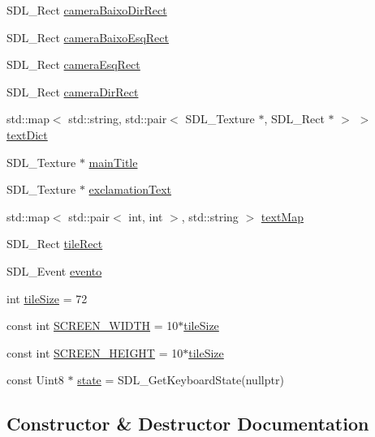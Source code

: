 \begin{DoxyCompactItemize}
\item 
S\+D\+L\+\_\+\+Rect \hyperlink{classViewer_aaad98d13a259888e00ed2d58ca4645a2}{camera\+Baixo\+Dir\+Rect}
\item 
S\+D\+L\+\_\+\+Rect \hyperlink{classViewer_a036f0479074b0bf9c1e74ce55d262a6b}{camera\+Baixo\+Esq\+Rect}
\item 
S\+D\+L\+\_\+\+Rect \hyperlink{classViewer_a03275a5d07e4096525ec9e3168268dd6}{camera\+Esq\+Rect}
\item 
S\+D\+L\+\_\+\+Rect \hyperlink{classViewer_a802293c85d676e0ceca2637312e9ca61}{camera\+Dir\+Rect}
\item 
std\+::map$<$ std\+::string, std\+::pair$<$ S\+D\+L\+\_\+\+Texture $\ast$, S\+D\+L\+\_\+\+Rect $\ast$ $>$ $>$ \hyperlink{classViewer_a336123429ce452088ba9833f8f80cfff}{text\+Dict}
\item 
S\+D\+L\+\_\+\+Texture $\ast$ \hyperlink{classViewer_a1bad0e9a1333a329d968d289938265a5}{main\+Title}
\item 
S\+D\+L\+\_\+\+Texture $\ast$ \hyperlink{classViewer_a9b3c83a12e44f5761001b4dd5369cf4f}{exclamation\+Text}
\item 
std\+::map$<$ std\+::pair$<$ int, int $>$, std\+::string $>$ \hyperlink{classViewer_a34e0e3043d5155be7fbaef0b07b647f8}{text\+Map}
\item 
S\+D\+L\+\_\+\+Rect \hyperlink{classViewer_a7e38c4e4399e4e4f4d9a1a148843d7f5}{tile\+Rect}
\item 
S\+D\+L\+\_\+\+Event \hyperlink{classViewer_a15a2d333c70e4d16bd85368bdbffaec7}{evento}
\item 
int \hyperlink{classViewer_a1c2c61744bd1f39a6c99671105eee03d}{tile\+Size} = 72
\item 
const int \hyperlink{classViewer_a57814822429ca824ac0c3d355df4ec78}{S\+C\+R\+E\+E\+N\+\_\+\+W\+I\+D\+TH} = 10$\ast$\hyperlink{classViewer_a1c2c61744bd1f39a6c99671105eee03d}{tile\+Size}
\item 
const int \hyperlink{classViewer_a20f47b2f2d1558fff5feb4dfe075f9fc}{S\+C\+R\+E\+E\+N\+\_\+\+H\+E\+I\+G\+HT} = 10$\ast$\hyperlink{classViewer_a1c2c61744bd1f39a6c99671105eee03d}{tile\+Size}
\item 
const Uint8 $\ast$ \hyperlink{classViewer_a2c820741a53119711fa1f43b812aa33b}{state} = S\+D\+L\+\_\+\+Get\+Keyboard\+State(nullptr)
\end{DoxyCompactItemize}


\subsection{Constructor \& Destructor Documentation}
\mbox{\label{classViewer_aaedebacb31cba87de6e7d448ed8d6586}} 
